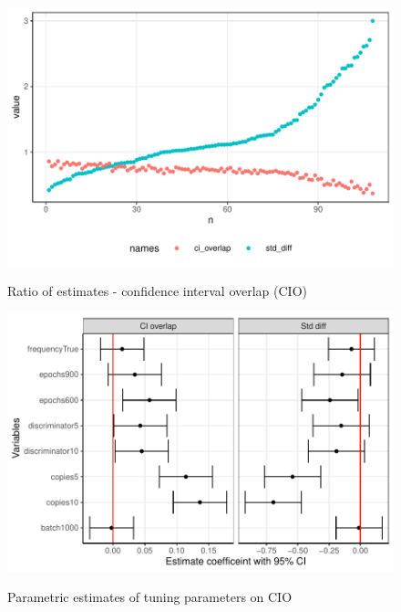 \documentclass[12pt]{article}
\begin{document}
\begin{figure}[!h]
    \centering
    \caption{Ratio of estimates - confidence interval overlap (CIO)}
    \includegraphics{../graphs/ctgan/graph_ctgan_cio_raw.pdf}
    \label{graph_ctgan_cio}
\end{figure}

\begin{figure}[!h]
    \centering
    \caption{Parametric estimates of tuning parameters on CIO}
    \includegraphics{../graphs/ctgan/graph_ctgan_cio.pdf}
    \label{graph_ctgan_cio}
\end{figure}
\end{document}
